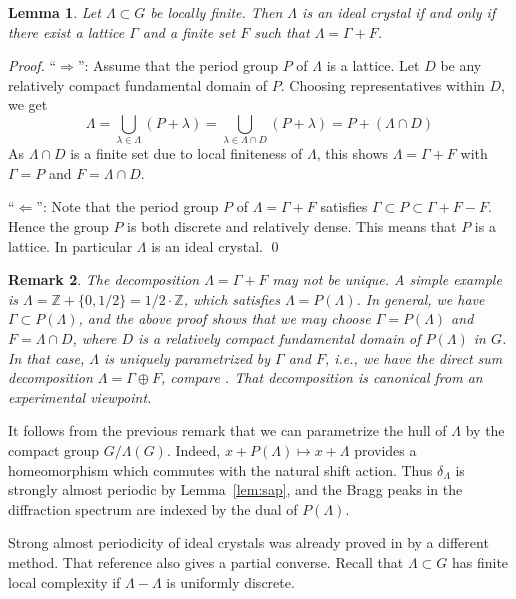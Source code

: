 \documentclass[11pt, a4wide]{amsart}
\newcommand{\ZZ}{\mathbb{Z}}
\newtheorem{lemma}{Lemma}
\newtheorem{remark}[lemma]{Remark}
\numberwithin{lemma}{section}
\begin{document}
\begin{lemma}
Let $\Lambda\subset G$ be locally finite. Then $\Lambda$ is an ideal crystal if and only if there exist a lattice $\Gamma$ and a finite set $F$ such that $\Lambda=\Gamma+F$.
\end{lemma}

\begin{proof}
``$\Rightarrow$'':
Assume that the period group $P$ of $\Lambda$ is a lattice. Let $D$ be any relatively compact fundamental domain of $P$. Choosing representatives within $D$, we get
%
\begin{displaymath}
\Lambda=\bigcup_{\lambda\in\Lambda}(P+\lambda)=
\bigcup_{\lambda\in\Lambda\cap D}(P+\lambda)=P+(\Lambda\cap D)
\end{displaymath}
%
As $\Lambda\cap D$ is a finite set due to local finiteness of $\Lambda$, this shows $\Lambda=\Gamma+F$ with $\Gamma=P$ and $F=\Lambda\cap D$.

\noindent ``$\Leftarrow$'':  Note that the period group $P$ of $\Lambda=\Gamma+F$ satisfies $\Gamma \subset P\subset \Gamma+F-F$. Hence the group $P$ is both discrete and relatively dense. This means that $P$ is a lattice. In particular $\Lambda$ is an ideal crystal.
\qed
\end{proof}

\begin{remark}\label{rem:dsd}
The decomposition $\Lambda =\Gamma+F$ may not be unique. A simple example is $\Lambda=\ZZ+\{0,1/2\}=1/2\cdot \ZZ$, which satisfies $\Lambda=P(\Lambda)$.
In general, we  have $\Gamma\subset P(\Lambda)$, and the above proof shows that we may choose $\Gamma=P(\Lambda)$ and $F=\Lambda \cap D$, where $D$ is a relatively compact fundamental domain of $P(\Lambda)$ in $G$. In that case, $\Lambda$ is uniquely parametrized by $\Gamma$ and $F$, i.e., we have the direct sum decomposition $\Lambda=\Gamma\oplus F$, compare \cite[Prop.~3.1]{BG2}. That decomposition is canonical from an experimental viewpoint.
\end{remark}

It follows from the previous remark that we can parametrize the hull of $\Lambda$ by the compact group $G/\Lambda(G)$. Indeed, $x+P(\Lambda)\mapsto x+\Lambda$ provides a homeomorphism which commutes with the natural shift action. Thus $\delta_\Lambda$ is strongly almost periodic by Lemma~\ref{lem:sap}, and the Bragg peaks in the diffraction spectrum are indexed by the dual of $P(\Lambda)$.

\smallskip

Strong almost periodicity of ideal crystals was already proved in \cite[Cor.~5.6]{KL13} by a different method. That reference also gives a partial converse. Recall that $\Lambda \subset G$ has finite local complexity if $\Lambda-\Lambda$ is uniformly discrete.
\end{document}
